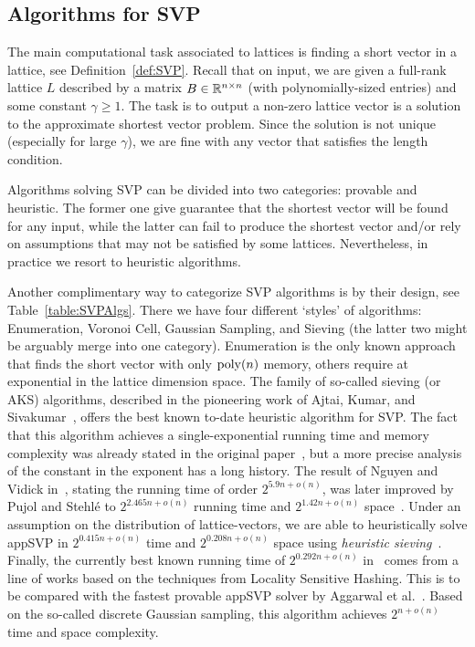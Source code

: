 \subsection{Algorithms for SVP }
The main computational task associated to lattices is finding a short vector in a lattice, see Definition~\ref{def:SVP}. Recall that on input, we are given a full-rank lattice $L$ described by a matrix $B \in \mathbb{R}^{n \times n}$ (with polynomially-sized entries) and some constant  $\gamma\geq 1$. The task is to output a non-zero lattice vector is a solution to the approximate shortest vector problem. Since the solution is not unique (especially for large $\gamma$), we are fine with any vector that satisfies the length condition.  

Algorithms solving SVP can be divided into two categories: provable and heuristic. The former one give guarantee that the shortest vector will be found for any input, while the latter can fail to produce the shortest vector and/or rely on assumptions that may not be satisfied by some lattices. Nevertheless, in practice we resort to heuristic algorithms. 

Another complimentary way to categorize SVP algorithms is by their design, see Table~\ref{table:SVPAlgs}. There we have four different `styles' of algorithms: Enumeration, Voronoi Cell, Gaussian Sampling, and Sieving (the latter two might be arguably merge into one category). Enumeration is the only known approach that finds the short vector with only $\operatorname{poly}(n)$ memory, others require at exponential in the lattice dimension space. The family of so-called sieving (or AKS) algorithms, described in the pioneering work of Ajtai, Kumar, and Sivakumar~\cite{AKS01}, offers the best known to-date heuristic algorithm for SVP. The fact that this algorithm achieves a single-exponential running time and memory complexity was already stated in the original paper~\cite{AKS01}, but a more precise analysis of the constant in the exponent has a long history. The result of Nguyen and Vidick in~\cite{NV08}, stating the running time of order $2^{5.9n+o(n)}$, was later improved by Pujol and Stehl{\'e} to $2^{2.465n+o(n)}$ running time and $2^{1.42n+o(n)}$ space~\cite{PS09}. Under an assumption on the distribution of lattice-vectors, we are able to heuristically solve appSVP in $2^{0.415n+o(n)}$ time and $2^{0.208n+o(n)}$ space using \emph{heuristic sieving}~\cite{NV08}. Finally, the currently best known running time of $2^{0.292n+o(n)}$ in~\cite{BDGL16} comes from a line of works based on the techniques from Locality Sensitive Hashing. This is to be compared with the fastest provable appSVP solver by Aggarwal et al.~\cite{ADRS15}. Based on the so-called discrete Gaussian sampling, this algorithm achieves $2^{n+o(n)}$ time and space complexity.

